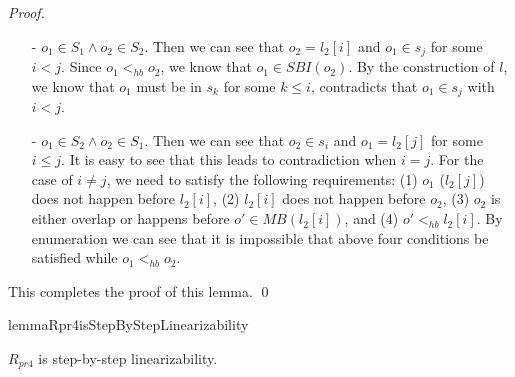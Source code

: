 \documentclass{llncs}
\begin{document}
\begin {proof}
\begin{itemize}
\setlength{\itemsep}{0.5pt}
\item[-] $o_1 \in S_1 \wedge o_2 \in S_2$. Then we can see that $o_2=l_2[i]$ and $o_1 \in s_j$ for some $i < j$. Since $o_1 <_{hb} o_2$, we know that $o_1 \in \textit{SBI}(o_2)$. By the construction of $l$, we know that $o_1$ must be in $s_k$ for some $k \leq i$, contradicts that $o_1 \in s_j$ with $i < j$.

\item[-] $o_1 \in S_2 \wedge o_2 \in S_1$. Then we can see that $o_2 \in s_i$ and $o_1 = l_2[j]$ for some $i \leq j$. It is easy to see that this leads to contradiction when $i = j$. For the case of $i \neq j$, we need to satisfy the following requirements: (1) $o_1$ ($l_2[j]$) does not happen before $l_2[i]$, (2) $l_2[i]$ does not happen before $o_2$, (3) $o_2$ is either overlap or happens before $o' \in \textit{MB}(l_2[i])$, and (4) $o' <_{hb} l_2[i]$. By enumeration we can see that it is impossible that above four conditions be satisfied while $o_1 <_{hb} o_2$.
\end{itemize}

This completes the proof of this lemma. \qed
\end {proof}





\begin{restatable}{lemma}{Rpr4isStepByStepLinearizability}
\label{lemma:Rpr4 is step-by-step linearizability}

$R_{\textit{pr4}}$ is step-by-step linearizability.

\end{restatable}
\end{document}
